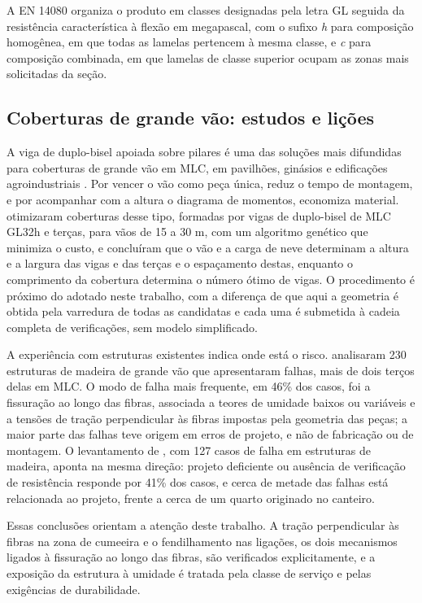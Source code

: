 A EN 14080 \cite{EN14080:2013} organiza o produto em classes designadas pela
letra GL seguida da resistência característica à flexão em megapascal, com o
sufixo \textit{h} para composição homogênea, em que todas as lamelas pertencem
à mesma classe, e \textit{c} para composição combinada, em que lamelas de
classe superior ocupam as zonas mais solicitadas da seção.

\subsection{Coberturas de grande vão: estudos e lições}\label{ssec:casos}

A viga de duplo-bisel apoiada sobre pilares é uma das soluções mais difundidas
para coberturas de grande vão em MLC, em pavilhões, ginásios e edificações
agroindustriais \cite{herzog:2004}. Por vencer o vão como peça única, reduz o
tempo de montagem, e por acompanhar com a altura o diagrama de momentos,
economiza material. \textcite{simonportela:2023} otimizaram coberturas desse
tipo, formadas por vigas de duplo-bisel de MLC GL32h e terças, para vãos de 15 a
30 m, com um algoritmo genético que minimiza o custo, e concluíram que o vão e a
carga de neve determinam a altura e a largura das vigas e das terças e o
espaçamento destas, enquanto o comprimento da cobertura determina o número
ótimo de vigas. O procedimento é próximo do adotado neste trabalho, com a
diferença de que aqui a geometria é obtida pela varredura de todas as
candidatas e cada uma é submetida à cadeia completa de verificações, sem modelo
simplificado.

A experiência com estruturas existentes indica onde está o risco.
\textcite{dietsch:2018} analisaram 230 estruturas de madeira de grande vão que
apresentaram falhas, mais de dois terços delas em MLC. O modo de falha mais
frequente, em 46\% dos casos, foi a fissuração ao longo das fibras, associada a
teores de umidade baixos ou variáveis e a tensões de tração perpendicular às
fibras impostas pela geometria das peças; a maior parte das falhas teve origem
em erros de projeto, e não de fabricação ou de montagem. O levantamento de
\textcite{fruhwald:2007}, com 127 casos de falha em estruturas de madeira,
aponta na mesma direção: projeto deficiente ou ausência de verificação de
resistência responde por 41\% dos casos, e cerca de metade das falhas está
relacionada ao projeto, frente a cerca de um quarto originado no canteiro.

Essas conclusões orientam a atenção deste trabalho. A tração perpendicular às
fibras na zona de cumeeira e o fendilhamento nas ligações, os dois mecanismos
ligados à fissuração ao longo das fibras, são verificados explicitamente, e a
exposição da estrutura à umidade é tratada pela classe de serviço e pelas
exigências de durabilidade.

